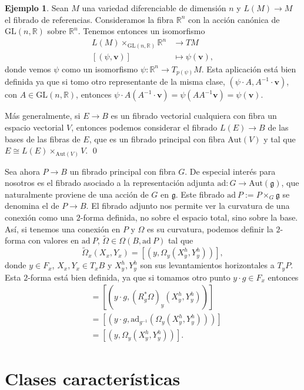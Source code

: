 \documentclass[12pt,a4paper]{article}
\theoremstyle{definition} \newtheorem{defn}[thm]{Definición}
\theoremstyle{definition} \newtheorem{ejemplo}[thm]{Ejemplo}
\theoremstyle{definition} \newtheorem{ejercicio}[thm]{Ejercicio}
\theoremstyle{remark} \newtheorem*{obs}{Observación}
\def\gg{\mathfrak{g}}
\def\ad{\mathrm{ad}}
\def\RR{\mathbb{R}}
\newcommand{\ve}[1]{\mathbf{#1}}
\let\emph\relax
\begin{document}
      \begin{ejemplo}
	Sean $M$ una variedad diferenciable de dimensión $n$ y $L(M)\rightarrow M$ el fibrado de referencias. Consideramos la fibra $\RR^n$ con la acción canónica de $\mathrm{GL}(n,\RR)$ sobre $\RR^n$. Tenemos entonces un isomorfismo
	\begin{align*}
	  L(M)\times_{\mathrm{GL}(n,\RR)} \RR^n&\longrightarrow TM\\ 
	   [(\psi, \ve{v})] &\longmapsto \psi(\ve{v}), 
	  \end{align*}
	  donde vemos $\psi$ como un isomorfismo $\psi:\RR^n \rightarrow T_{p(\psi)}M$. Esta aplicación está bien definida ya que si tomo otro representante de la misma clase, $(\psi \cdot A, A^{-1} \cdot \ve{v})$, con $A\in \mathrm{GL}(n,\RR)$, entonces $\psi\cdot A (A^{-1} \cdot \ve{v})= \psi(A A^{-1} \ve{v})=\psi(\ve{v})$. 

	  Más generalmente, si $E\rightarrow B$ es un fibrado vectorial cualquiera con fibra un espacio vectorial $V$, entonces podemos considerar el fibrado $L(E)\rightarrow B$ de las bases de las fibras de $E$, que es un fibrado principal con fibra $\mathrm{Aut}(V)$ y tal que $E\cong L(E)\times_{\mathrm{Aut}(V)} V$.
	  \qed
      \end{ejemplo}

      Sea ahora $P\rightarrow B$ un fibrado principal con fibra $G$. De especial interés para nosotros es el fibrado asociado a la representación adjunta $\ad:G\rightarrow \mathrm{Aut}(\gg)$, que naturalmente proviene de una acción de $G$ en $\gg$. Este fibrado $\ad\ P:=P\times_G \gg$ se denomina el \emph{fibrado adjunto} de $P\rightarrow B$. El fibrado adjunto nos permite ver la curvatura de una conexión como una $2$-forma definida, no sobre el espacio total, sino sobre la base. Así, si tenemos una conexión en $P$ y $\Omega$ es su curvatura, podemos definir la $2$-forma con valores en $\ad\ P$, $\tilde{\Omega}\in \Omega(B,\ad\ P)$ tal que
      \begin{equation*}
	\tilde{\Omega}_x(X_x,Y_x)=[(y,\Omega_y(X_y^h,Y_y^h))],
      \end{equation*}
      donde $y\in F_x$, $X_x,Y_x \in T_xB$ y $X_y^h,Y_y^h$ son sus levantamientos horizontales a $T_y P$. Esta $2$-forma está bien definida, ya que si tomamos otro punto $y\cdot g \in F_x$ entonces
      \begin{align*}
	[(y\cdot g,\Omega_{y\cdot g}(X^h_{y\cdot g},Y^h_{y\cdot g})]&=[(y\cdot g, (R^*_g\Omega)_y(X^h_y,Y^h_y))]\\ &=[(y\cdot g,\ad_{g^{-1}}(\Omega_y(X_y^h,Y_y^h)))]\\&=[(y,\Omega_y(X^h_y,Y^h_y))].
      \end{align*}

	\section{Clases características}
\end{document}
